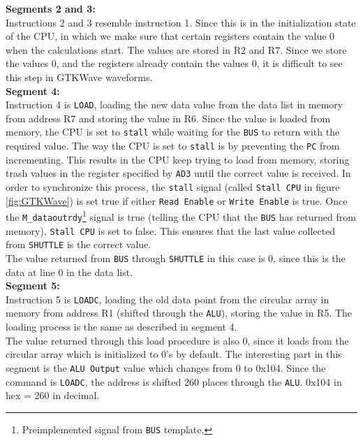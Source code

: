 \textbf{Segments 2 and 3:} \\
Instructions 2 and 3 resemble instruction 1. Since this is in the initialization state of the CPU, in which we make sure that certain registers contain the value 0 when the calculations start. The values are stored in R2 and R7. Since we store the values 0, and the registers already contain the values 0, it is difficult to see this step in GTKWave waveforms. \\

\textbf{Segment 4:} \\
Instruction 4 is \texttt{LOAD}, loading the new data value from the data list in memory from address R7 and storing the value in R6. Since the value is loaded from memory, the CPU is set to \texttt{stall} while waiting for the \texttt{BUS} to return with the required value. The way the CPU is set to \texttt{stall} is by preventing the \texttt{PC} from incrementing. This results in the CPU keep trying to load from memory, storing trash values in the register specified by \texttt{AD3} until the correct value is received. In order to synchronize this process, the \texttt{stall} signal (called \texttt{Stall CPU} in figure \ref{fig:GTKWave}) is set true if either \texttt{Read Enable} or \texttt{Write Enable} is true. Once the \texttt{M\_dataoutrdy}\footnote{Preimplemented signal from \texttt{BUS} template.} signal is true (telling the CPU that the \texttt{BUS} has returned from memory), \texttt{Stall CPU} is set to false. This ensures that the last value collected from \texttt{SHUTTLE} is the correct value. \\
The value returned from \texttt{BUS} through \texttt{SHUTTLE} in this case is 0, since this is the data at line 0 in the data list. \\

\textbf{Segment 5:} \\
Instruction 5 is \texttt{LOADC}, loading the old data point from the circular array in memory from address R1 (shifted through the \texttt{ALU}), storing the value in R5. The loading process is the same as described in segment 4. \\
The value returned through this load procedure is also 0, since it loads from the circular array which is initialized to 0's by default. The interesting part in this segment is the \texttt{ALU Output} value which changes from 0 to 0x104. Since the command is \texttt{LOADC}, the address is shifted 260 places through the \texttt{ALU}. 0x104 in hex = 260 in decimal.
